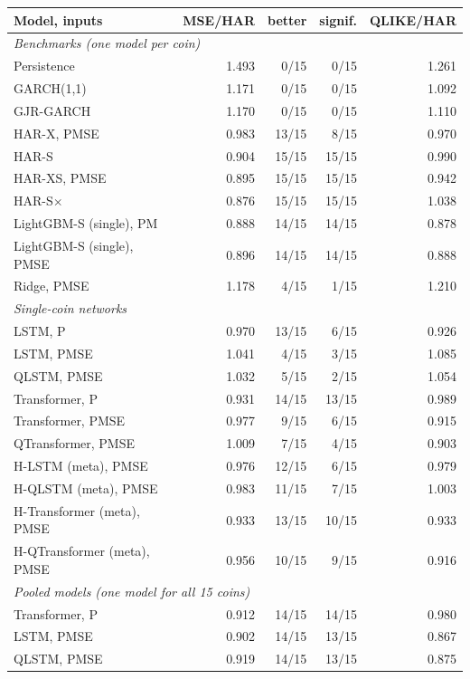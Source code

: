 \begin{tabular}{lrrrr}
\toprule
Model, inputs & MSE/HAR & better & signif. & QLIKE/HAR \\
\midrule
\multicolumn{5}{l}{\emph{Benchmarks (one model per coin)}} \\
Persistence & 1.493 & 0/15 & 0/15 & 1.261 \\
GARCH(1,1) & 1.171 & 0/15 & 0/15 & 1.092 \\
GJR-GARCH & 1.170 & 0/15 & 0/15 & 1.110 \\
HAR-X, PMSE & 0.983 & 13/15 & 8/15 & 0.970 \\
HAR-S & 0.904 & 15/15 & 15/15 & 0.990 \\
HAR-XS, PMSE & 0.895 & 15/15 & 15/15 & 0.942 \\
HAR-S$\times$ & 0.876 & 15/15 & 15/15 & 1.038 \\
LightGBM-S (single), PM & 0.888 & 14/15 & 14/15 & 0.878 \\
LightGBM-S (single), PMSE & 0.896 & 14/15 & 14/15 & 0.888 \\
Ridge, PMSE & 1.178 & 4/15 & 1/15 & 1.210 \\
\midrule
\multicolumn{5}{l}{\emph{Single-coin networks}} \\
LSTM, P & 0.970 & 13/15 & 6/15 & 0.926 \\
LSTM, PMSE & 1.041 & 4/15 & 3/15 & 1.085 \\
QLSTM, PMSE & 1.032 & 5/15 & 2/15 & 1.054 \\
Transformer, P & 0.931 & 14/15 & 13/15 & 0.989 \\
Transformer, PMSE & 0.977 & 9/15 & 6/15 & 0.915 \\
QTransformer, PMSE & 1.009 & 7/15 & 4/15 & 0.903 \\
H-LSTM (meta), PMSE & 0.976 & 12/15 & 6/15 & 0.979 \\
H-QLSTM (meta), PMSE & 0.983 & 11/15 & 7/15 & 1.003 \\
H-Transformer (meta), PMSE & 0.933 & 13/15 & 10/15 & 0.933 \\
H-QTransformer (meta), PMSE & 0.956 & 10/15 & 9/15 & 0.916 \\
\midrule
\multicolumn{5}{l}{\emph{Pooled models (one model for all 15 coins)}} \\
Transformer, P & 0.912 & 14/15 & 14/15 & 0.980 \\
LSTM, PMSE & 0.902 & 14/15 & 13/15 & 0.867 \\
QLSTM, PMSE & 0.919 & 14/15 & 13/15 & 0.875 \\

\end{tabular}
